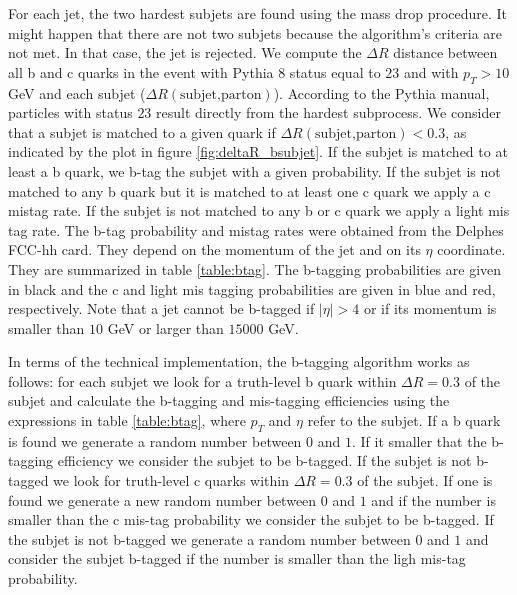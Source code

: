 For each jet, the two hardest subjets are found using the mass drop procedure. It might happen that there are not two subjets because the algorithm's criteria are not met. In that case, the jet is rejected. We compute the $\Delta R$ distance between all b and c quarks in the event with Pythia 8 status equal to $23$ and with $p_T>10$ GeV and each subjet ($\Delta R(\text{subjet,parton})$). According to the Pythia manual, particles with status $23$ result directly from the hardest subprocess. We consider that a subjet is matched to a given quark if $\Delta R(\text{subjet,parton})<0.3$, as indicated by the plot in figure \ref{fig:deltaR_bsubjet}. If the subjet is matched to at least a b quark, we b-tag the subjet with a given probability. If the subjet is not matched to any b quark but it is matched to at least one c quark we apply a c mistag rate. If the subjet is not matched to any b or c quark we apply a light mis tag rate. The b-tag probability and mistag rates were obtained from the Delphes FCC-hh card. They depend on the momentum of the jet and on its $\eta$ coordinate. They are summarized in table \ref{table:btag}. The b-tagging probabilities are given in black and the c and light mis tagging probabilities are given in blue and red, respectively. Note that a jet cannot be b-tagged if $|\eta|>4$ or if its momentum is smaller than $10$ GeV or larger than $15000$ GeV.

In terms of the technical implementation, the b-tagging algorithm works as follows: for each subjet we look for a truth-level b quark within $\Delta R=0.3$ of the subjet and calculate the b-tagging and mis-tagging efficiencies using the expressions in table \ref{table:btag}, where $p_T$ and $\eta$ refer to the subjet. If a b quark is found we generate a random number between $0$ and $1$. If it smaller that the b-tagging efficiency we consider the subjet to be b-tagged. If the subjet is not b-tagged we look for truth-level c quarks within $\Delta R=0.3$ of the subjet. If one is found we generate a new random number between $0$ and $1$ and if the number is smaller than the c mis-tag probability we consider the subjet to be b-tagged. If the subjet is not b-tagged we generate a random number between $0$ and $1$ and consider the subjet b-tagged if the number is smaller than the ligh mis-tag probability. 

